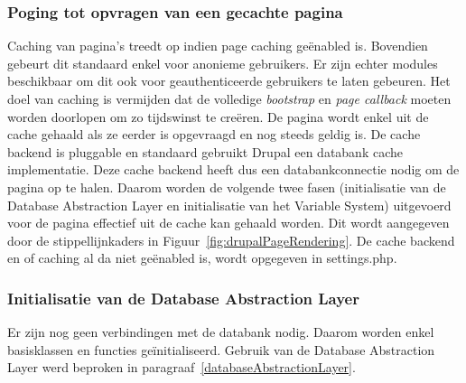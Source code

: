 \subsubsection{Poging tot opvragen van een gecachte pagina}
Caching van pagina's treedt op indien page caching ge\"{e}nabled is. Bovendien gebeurt dit standaard enkel voor anonieme gebruikers. Er zijn echter modules beschikbaar om dit ook voor geauthenticeerde gebruikers te laten gebeuren. Het doel van caching is vermijden dat de volledige \textit{bootstrap} en \textit{page callback} moeten worden doorlopen om zo tijdswinst te cre\"{e}ren. De pagina  wordt enkel uit de cache gehaald als ze eerder is opgevraagd en nog steeds geldig is. De cache backend is pluggable en standaard gebruikt Drupal een databank cache implementatie. Deze cache backend heeft dus een databankconnectie nodig om de pagina op te halen. Daarom worden de volgende twee fasen (initialisatie van de Database Abstraction Layer en initialisatie van het Variable System) uitgevoerd voor de pagina effectief uit de cache kan gehaald worden. Dit wordt aangegeven door de stippellijnkaders in Figuur~\ref{fig:drupalPageRendering}. De cache backend en of caching al da niet ge\"{e}nabled is, wordt opgegeven in settings.php.

\subsubsection{Initialisatie van de Database Abstraction Layer}
Er zijn nog geen verbindingen met de databank nodig. Daarom worden enkel basisklassen en functies ge\"{i}nitialiseerd. Gebruik van de Database Abstraction Layer werd beproken in paragraaf~\ref{databaseAbstractionLayer}.

